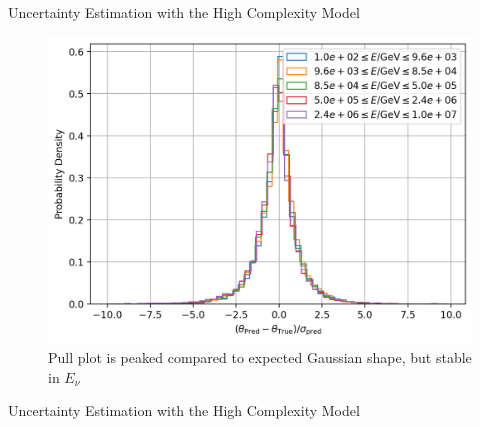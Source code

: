 \begin{frame}{Uncertainty Estimation with the High Complexity Model}
    \begin{figure}
        \centering
        \includegraphics[width=.6\textwidth]{media/pulls.png}
        \caption*{\small Pull plot is peaked compared to expected Gaussian shape, but stable in $E_\nu$}
    \end{figure}
\end{frame}
\begin{frame}{Uncertainty Estimation with the High Complexity Model}
    \begin{figure}
        \centering
    \end{figure}
\end{frame}